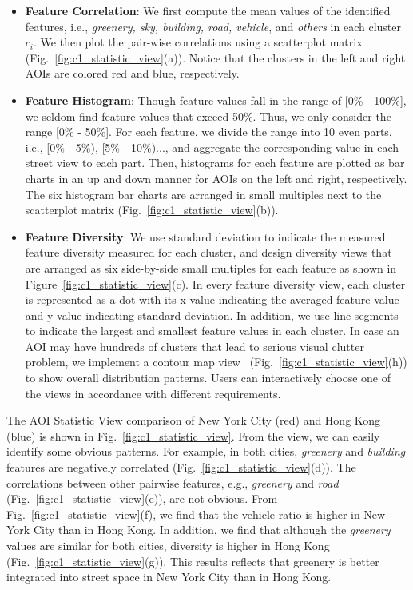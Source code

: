 \vspace*{-2mm}
\begin{itemize}

\item
\textbf{Feature Correlation}:
We first compute the mean values of the identified features, i.e., \textit{greenery, sky, building, road, vehicle}, and \textit{others} in each cluster $c_i$.
We then plot the pair-wise correlations using a scatterplot matrix (Fig.~\ref{fig:c1_statistic_view}(a)).
Notice that the clusters in the left and right AOIs are colored red and blue, respectively.

\vspace*{-1mm}
\item
\textbf{Feature Histogram}:
Though feature values fall in the range of [0\% - 100\%], we seldom find feature values that exceed 50\%.
Thus, we only consider the range [0\% - 50\%].
For each feature, we divide the range into 10 even parts, i.e., [0\% - 5\%), [5\% - 10\%)..., and aggregate the corresponding value in each street view to each part.
Then, histograms for each feature are plotted as bar charts in an up and down manner for AOIs on the left and right, respectively.
The six histogram bar charts are arranged in small multiples next to the scatterplot matrix (Fig.~\ref{fig:c1_statistic_view}(b)).

\vspace*{-1mm}
\item
\textbf{Feature Diversity}:
We use standard deviation to indicate the measured feature diversity measured for each cluster, and design diversity views that are arranged as six side-by-side small multiples for each feature as shown in Figure~\ref{fig:c1_statistic_view}(c).
In every feature diversity view, each cluster is represented as a dot with its x-value indicating the averaged feature value and y-value indicating standard deviation.
In addition, we use line segments to indicate the largest and smallest feature values in each cluster. 
In case an AOI may have hundreds of clusters that lead to serious visual clutter problem, we implement a contour map view~\cite{chen_2014_visual} (Fig.~\ref{fig:c1_statistic_view}(h)) to show overall distribution patterns.
Users can interactively choose one of the views in accordance with different requirements.

\end{itemize}

The AOI Statistic View comparison of New York City (red) and Hong Kong (blue) is shown in Fig.~\ref{fig:c1_statistic_view}.
From the view, we can easily identify some obvious patterns.
For example, in both cities, \textit{greenery} and \textit{building} features are negatively correlated (Fig.~\ref{fig:c1_statistic_view}(d)).
The correlations between other pairwise features, e.g., \textit{greenery} and \textit{road} (Fig.~\ref{fig:c1_statistic_view}(e)), are not obvious.
From Fig.~\ref{fig:c1_statistic_view}(f), we find that the vehicle ratio is higher in New York City than in Hong Kong.
In addition, we find that although the \textit{greenery} values are similar for both cities, diversity is higher in Hong Kong (Fig.~\ref{fig:c1_statistic_view}(g)).
This results reflects that greenery is better integrated into street space in New York City than in Hong Kong.

